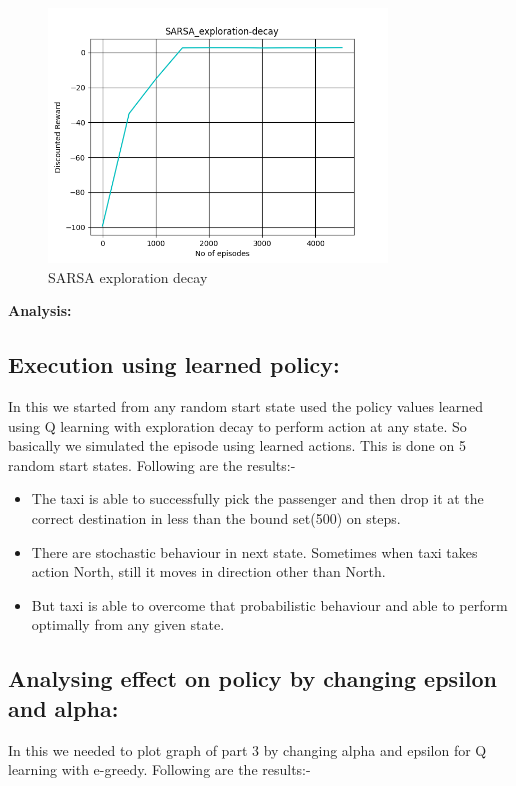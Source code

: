 \documentclass{article}
\begin{document}
\begin{enumerate}[a)]
\begin{center}
    \begin{figure}[H]
    \hfill\includegraphics[width=9cm]{QB2_SARSA_exploration-decay.png}\hspace*{\fill}
    \caption{SARSA exploration decay}
    \label{fig:SARSA_exploration-decay}
\end{figure}
\end{center}

\textbf{Analysis: }


\subsection{Execution using learned policy:}
In this we started from any random start state used the policy values learned using Q learning with exploration decay to perform action at any state. So basically 
we simulated the episode using learned actions. This is done on 5 random start states. Following are the results:-

\begin{itemize}
    \item The taxi is able to successfully pick the passenger and then drop it at the correct destination in less than the bound set(500) on steps.
    \item There are stochastic behaviour in next state. Sometimes when taxi takes action North, still it moves in direction other than North.
    \item But taxi is able to overcome that probabilistic behaviour and able to perform optimally from any given state.
\end{itemize}

\subsection{Analysing effect on policy by changing epsilon and alpha:}
In this we needed to plot graph of part 3 by changing alpha and epsilon for Q learning with e-greedy. Following are the results:- 


\end{enumerate}
\end{document}
